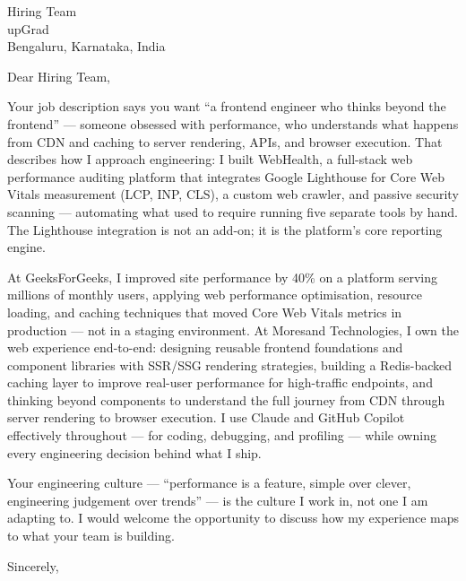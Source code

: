\documentclass[11pt,a4paper]{letter}
\begin{document}
\begin{letter}{Hiring Team \\ upGrad \\ Bengaluru, Karnataka, India}

\opening{Dear Hiring Team,}

Your job description says you want ``a frontend engineer who thinks beyond the frontend'' --- someone obsessed with performance, who understands what happens from CDN and caching to server rendering, APIs, and browser execution. That describes how I approach engineering: I built WebHealth, a full-stack web performance auditing platform that integrates Google Lighthouse for Core Web Vitals measurement (LCP, INP, CLS), a custom web crawler, and passive security scanning --- automating what used to require running five separate tools by hand. The Lighthouse integration is not an add-on; it is the platform's core reporting engine.

At GeeksForGeeks, I improved site performance by 40\% on a platform serving millions of monthly users, applying web performance optimisation, resource loading, and caching techniques that moved Core Web Vitals metrics in production --- not in a staging environment. At Moresand Technologies, I own the web experience end-to-end: designing reusable frontend foundations and component libraries with SSR/SSG rendering strategies, building a Redis-backed caching layer to improve real-user performance for high-traffic endpoints, and thinking beyond components to understand the full journey from CDN through server rendering to browser execution. I use Claude and GitHub Copilot effectively throughout --- for coding, debugging, and profiling --- while owning every engineering decision behind what I ship.

Your engineering culture --- ``performance is a feature, simple over clever, engineering judgement over trends'' --- is the culture I work in, not one I am adapting to. I would welcome the opportunity to discuss how my experience maps to what your team is building.

\closing{Sincerely,}

\end{letter}
\end{document}
